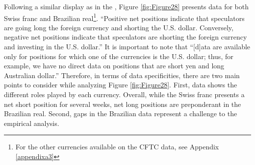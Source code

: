 \documentclass[a4paper, twoside]{templates/ociamthesis}
\begin{document}
Following a similar display as in the \textcite[Graph A7,  36]{bankforinternationalsettlements2015}, Figure \ref{fig:Figure28} presents data for both Swiss franc and Brazilian real\footnote{For the other currencies available on the CFTC data, see Appendix \ref{appendixa3}}. ``Positive net positions indicate that speculators are going long the foreign currency and shorting the U.S. dollar. Conversely, negative net positions indicate that speculators are shorting the foreign currency and investing in the U.S. dollar.'' \autocite[ 438-439]{curcuru2011} It is important to note that ``{[}d{]}ata are available only for positions for which one of the currencies is the U.S. dollar; thus, for example, we have no direct data on positions that are short yen and long Australian dollar.'' \autocite[ 439]{curcuru2011} Therefore, in terms of data specificities, there are two main points to consider while analyzing Figure \ref{fig:Figure28}. First, data shows the different roles played by each currency. Overall, while the Swiss franc presents a net short position for several weeks, net long positions are preponderant in the Brazilian real. Second, gaps in the Brazilian data represent a challenge to the empirical analysis.
\end{document}
